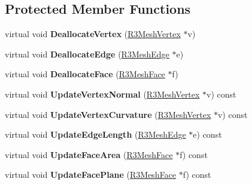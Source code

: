 \subsection*{Protected Member Functions}
\begin{DoxyCompactItemize}
\item 
virtual void {\bfseries Deallocate\+Vertex} (\hyperlink{class_r3_mesh_vertex}{R3\+Mesh\+Vertex} $\ast$v)\hypertarget{class_r3_mesh_ad509d9efde0b1b5eb3955a496fb178e4}{}\label{class_r3_mesh_ad509d9efde0b1b5eb3955a496fb178e4}

\item 
virtual void {\bfseries Deallocate\+Edge} (\hyperlink{class_r3_mesh_edge}{R3\+Mesh\+Edge} $\ast$e)\hypertarget{class_r3_mesh_a8c85f592889ae796883dec3aa49a12da}{}\label{class_r3_mesh_a8c85f592889ae796883dec3aa49a12da}

\item 
virtual void {\bfseries Deallocate\+Face} (\hyperlink{class_r3_mesh_face}{R3\+Mesh\+Face} $\ast$f)\hypertarget{class_r3_mesh_af8e4e344b395de43582d1a5c2f1d05a5}{}\label{class_r3_mesh_af8e4e344b395de43582d1a5c2f1d05a5}

\item 
virtual void {\bfseries Update\+Vertex\+Normal} (\hyperlink{class_r3_mesh_vertex}{R3\+Mesh\+Vertex} $\ast$v) const \hypertarget{class_r3_mesh_a4c698786f6fd3dbede4314b0bfa1b9b9}{}\label{class_r3_mesh_a4c698786f6fd3dbede4314b0bfa1b9b9}

\item 
virtual void {\bfseries Update\+Vertex\+Curvature} (\hyperlink{class_r3_mesh_vertex}{R3\+Mesh\+Vertex} $\ast$v) const \hypertarget{class_r3_mesh_a9ff7ad21614f64f3c6cfe4c9c63d2bc8}{}\label{class_r3_mesh_a9ff7ad21614f64f3c6cfe4c9c63d2bc8}

\item 
virtual void {\bfseries Update\+Edge\+Length} (\hyperlink{class_r3_mesh_edge}{R3\+Mesh\+Edge} $\ast$e) const \hypertarget{class_r3_mesh_a89768bf5e315f3cf9f2cb6791e976173}{}\label{class_r3_mesh_a89768bf5e315f3cf9f2cb6791e976173}

\item 
virtual void {\bfseries Update\+Face\+Area} (\hyperlink{class_r3_mesh_face}{R3\+Mesh\+Face} $\ast$f) const \hypertarget{class_r3_mesh_a1614de3db3329580b2f624140c50fe64}{}\label{class_r3_mesh_a1614de3db3329580b2f624140c50fe64}

\item 
virtual void {\bfseries Update\+Face\+Plane} (\hyperlink{class_r3_mesh_face}{R3\+Mesh\+Face} $\ast$f) const \hypertarget{class_r3_mesh_acb3735cd679e07f6ccfaab07234352a4}{}\label{class_r3_mesh_acb3735cd679e07f6ccfaab07234352a4}


\end{DoxyCompactItemize}

